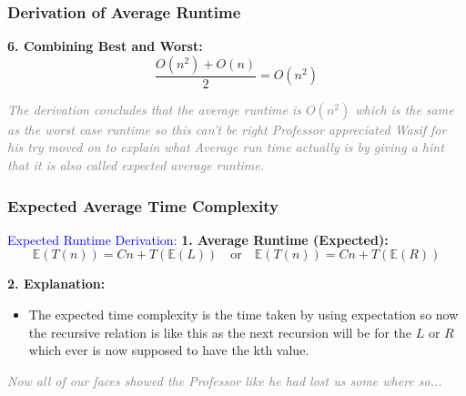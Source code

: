 \begin{frame}
    \frametitle{Derivation of Average Runtime}
    \vspace{0.4cm}
    \begin{block}
        
        \vspace{0.3cm}
        \textbf{6. Combining Best and Worst:}
        \[
        \frac{O(n^2) + O(n)}{2} = O(n^2)
        \]
    \end{block}

    \vspace{0.4cm}
    \begin{center}
        \textit{\textcolor{gray}{The derivation concludes that the average runtime is \( O(n^2) \) which is the same as the worst case runtime so this can't be right Professor appreciated Wasif for his try moved on to explain what Average run time actually is by giving a hint that it is also called expected average runtime.}}
    \end{center}
\end{frame}

\begin{frame}
    \frametitle{Expected Average Time Complexity}
    \vspace{0.4cm}

    \begin{block}{\textcolor{blue}{Expected Runtime Derivation:}}
        \textbf{1. Average Runtime (Expected):}
        \[
        \mathbb{E}(T(n)) = Cn + T(\mathbb{E}(L)) \quad \text{or} \quad \mathbb{E}(T(n)) = Cn + T(\mathbb{E}(R))
        \]
        
        \textbf{2. Explanation:}
        \begin{itemize}
            \item The expected time complexity is the time taken by using expectation so now the recursive relation is like this as the next recursion will be for the $L$ or $R$ which ever is now supposed to have the kth value.
        \end{itemize}

        \vspace{0.3cm}
  
    \end{block}

    \vspace{0.4cm}
    \begin{center}
        \textit{\textcolor{gray}{Now all of our faces showed the Professor like he had lost us some where so...}}
    \end{center}
\end{frame}

